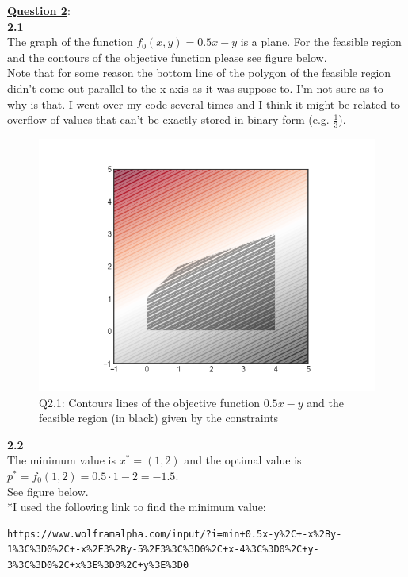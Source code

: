 \documentclass[fleqn]{article}
\begin{document}
\clearpage\underline{\textbf{Question 2}}:\\
\textbf{2.1} \\
The graph of the function $f_0(x,y) = 0.5x-y$ is a plane. For the feasible region and the contours of the objective function please see figure below.\\

Note that for some reason the bottom line of the polygon of the feasible region didn't come out parallel to the x axis as it was suppose to. I'm not sure as to why is that. I went over my code several times and I think it might be related to overflow of values that can't be exactly stored in binary form (e.g. $\frac{1}{3}$).\\

\begin{figure}[h!]
\includegraphics[width=0.8\linewidth]{q2_1.PNG}
\caption{Q2.1: Contours lines of the objective function $0.5x-y$ and the feasible region (in black) given by the constraints}
\end{figure}

\textbf{2.2} \\
The minimum value is $x^* = (1,2)$ and the optimal value is $p^* = f_0(1,2) = 0.5 \cdot 1 -2 = -1.5$. \\
See figure below.\\

*I used the following link to find the minimum value: \\
\begin{lstlisting}[breaklines]
https://www.wolframalpha.com/input/?i=min+0.5x-y%2C+-x%2By-1%3C%3D0%2C+-x%2F3%2By-5%2F3%3C%3D0%2C+x-4%3C%3D0%2C+y-3%3C%3D0%2C+x%3E%3D0%2C+y%3E%3D0
\end{lstlisting} 
\end{document}
